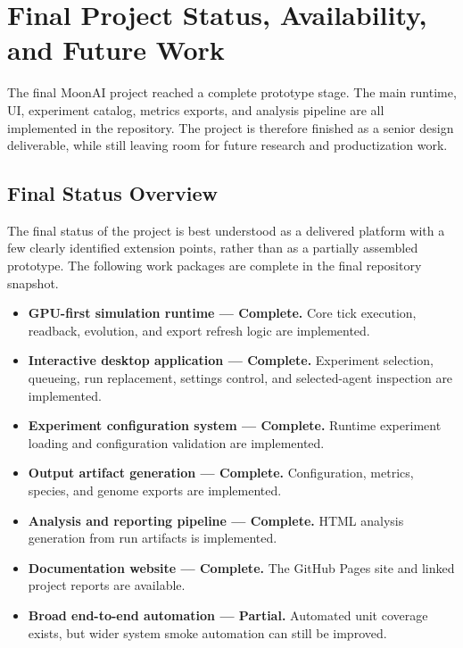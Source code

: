 \section{Final Project Status, Availability, and Future Work}
\label{sec:status}

The final MoonAI project reached a complete prototype stage. The main runtime, UI, experiment
catalog, metrics exports, and analysis pipeline are all implemented in the repository. The
project is therefore finished as a senior design deliverable, while still leaving room for
future research and productization work.

\subsection{Final Status Overview}

The final status of the project is best understood as a delivered platform with a few clearly
identified extension points, rather than as a partially assembled prototype. The following work
packages are complete in the final repository snapshot.

\begin{itemize}[leftmargin=*]
  \item \textbf{GPU-first simulation runtime --- Complete.} Core tick execution, readback,
  evolution, and export refresh logic are implemented.

  \item \textbf{Interactive desktop application --- Complete.} Experiment selection, queueing,
  run replacement, settings control, and selected-agent inspection are implemented.

  \item \textbf{Experiment configuration system --- Complete.} Runtime experiment loading and
  configuration validation are implemented.

  \item \textbf{Output artifact generation --- Complete.} Configuration, metrics, species, and
  genome exports are implemented.

  \item \textbf{Analysis and reporting pipeline --- Complete.} HTML analysis generation from run
  artifacts is implemented.

  \item \textbf{Documentation website --- Complete.} The GitHub Pages site and linked project
  reports are available.

  \item \textbf{Broad end-to-end automation --- Partial.} Automated unit coverage exists, but
  wider system smoke automation can still be improved.
\end{itemize}


